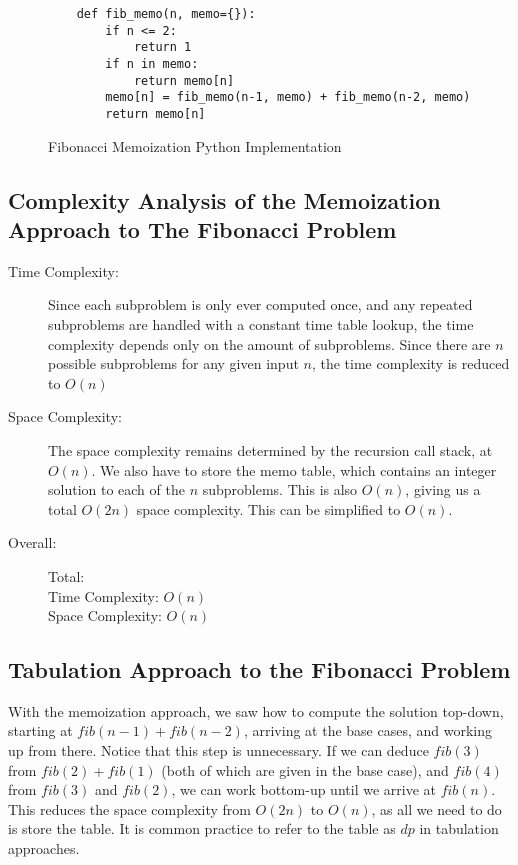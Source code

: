 \begin{figure}[H]
    \centering
    \begin{lstlisting}
    def fib_memo(n, memo={}):
        if n <= 2:
            return 1
        if n in memo:
            return memo[n]
        memo[n] = fib_memo(n-1, memo) + fib_memo(n-2, memo)
        return memo[n]
    \end{lstlisting}
    \caption{Fibonacci Memoization Python Implementation}
    \label{fig:fibonacci-memo}
\end{figure}

\subsection{Complexity Analysis of the Memoization Approach to The Fibonacci Problem}

\begin{description}
    \item[Time Complexity:]
        Since each subproblem is only ever computed once, and any repeated subproblems are handled with a constant time table lookup,
        the time complexity depends only on the amount of subproblems.
        Since there are $n$ possible subproblems for any given input $n$,
        the time complexity is reduced to $O(n)$

    \item[Space Complexity:] 
        The space complexity remains determined by the recursion call stack, at $O(n)$.
        We also have to store the memo table, which contains an integer solution to each of the $n$ subproblems.
        This is also $O(n)$, giving us a total $O(2n)$ space complexity.
        This can be simplified to $O(n)$.

    \item[Overall:] Total:\\
        Time Complexity: $O(n)$\\
        Space Complexity: $O(n)$
        
\end{description}

\subsection{Tabulation Approach to the Fibonacci Problem}
    
With the memoization approach, we saw how to compute the solution top-down, starting at $fib(n-1) + fib(n-2)$,
arriving at the base cases, and working up from there.
Notice that this step is unnecessary.
If we can deduce $fib(3)$ from $fib(2) + fib(1)$ (both of which are given in the base case),
and $fib(4)$ from $fib(3)$ and $fib(2)$,
we can work bottom-up until we arrive at $fib(n)$.
This reduces the space complexity from $O(2n)$ to $O(n)$,
as all we need to do is store the table.
It is common practice to refer to the table as $dp$ in tabulation approaches.

